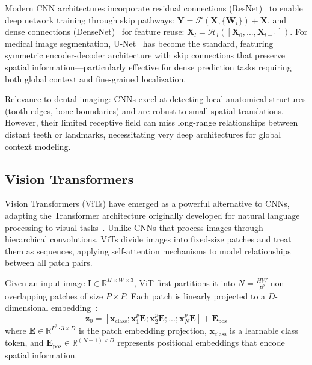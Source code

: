 Modern CNN architectures incorporate residual connections (ResNet)~\cite{george2025deep} to enable deep network training through skip pathways: $\mathbf{Y} = \mathcal{F}(\mathbf{X}, \{\mathbf{W}_i\}) + \mathbf{X}$, and dense connections (DenseNet)~\cite{hassanein2024utilizing} for feature reuse: $\mathbf{X}_l = \mathcal{H}_l([\mathbf{X}_0, ..., \mathbf{X}_{l-1}])$. For medical image segmentation, U-Net~\cite{hassanein2024utilizing} has become the standard, featuring symmetric encoder-decoder architecture with skip connections that preserve spatial information—particularly effective for dense prediction tasks requiring both global context and fine-grained localization.

Relevance to dental imaging: CNNs excel at detecting local anatomical structures (tooth edges, bone boundaries) and are robust to small spatial translations. However, their limited receptive field can miss long-range relationships between distant teeth or landmarks, necessitating very deep architectures for global context modeling.

\subsection{Vision Transformers}

Vision Transformers (ViTs) have emerged as a powerful alternative to CNNs, adapting the Transformer architecture originally developed for natural language processing to visual tasks~\cite{ali2025interpretable}. Unlike CNNs that process images through hierarchical convolutions, ViTs divide images into fixed-size patches and treat them as sequences, applying self-attention mechanisms to model relationships between all patch pairs.

Given an input image $\mathbf{I} \in \mathbb{R}^{H \times W \times 3}$, ViT first partitions it into $N = \frac{HW}{P^2}$ non-overlapping patches of size $P \times P$. Each patch is linearly projected to a $D$-dimensional embedding~\cite{ali2025interpretable}:
\begin{equation}
\mathbf{z}_0 = [\mathbf{x}_{\text{class}}; \mathbf{x}_1^p\mathbf{E}; \mathbf{x}_2^p\mathbf{E}; ...; \mathbf{x}_N^p\mathbf{E}] + \mathbf{E}_{\text{pos}}
\end{equation}
where $\mathbf{E} \in \mathbb{R}^{P^2 \cdot 3 \times D}$ is the patch embedding projection, $\mathbf{x}_{\text{class}}$ is a learnable class token, and $\mathbf{E}_{\text{pos}} \in \mathbb{R}^{(N+1) \times D}$ represents positional embeddings that encode spatial information.

